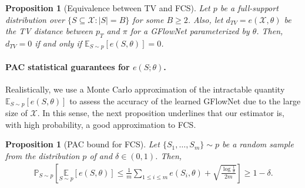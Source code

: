 \documentclass{article}
\theoremstyle{plain}
\newtheorem{proposition}[theorem]{Proposition}
\theoremstyle{definition}
\theoremstyle{remark}
\theoremstyle{remark}
\begin{document}
\begin{proposition}[Equivalence between TV and FCS] \label{prop:tv_fsc}  
    Let $p$ be a full-support distribution over $\{S \subseteq \mathcal{X} \colon |S| = B\}$ for some $B \ge 2$. Also, let $d_{TV} = e(\mathcal{X}, \theta)$ be the TV distance between $p_{T}$ and $\pi$ for a GFlowNet parameterized by $\theta$. Then, $d_{TV} = 0$ if and only if $\mathbb{E}_{S \sim p}[e(S, \theta)] = 0$.   
\end{proposition}





\paragraph{PAC statistical guarantees for $e(S ; \theta)$.} Realistically, we use a Monte Carlo approximation of the intractable quantity $\mathbb{E}_{S \sim p}[e(S, \theta)]$ to assess the accuracy of the learned GFlowNet due to the large size of $\mathcal{X}$. In this sense, the next proposition underlines that our estimator is, with high probability, a good approximation to FCS. %

\begin{proposition}[PAC bound for FCS] \label{prop:pac} 
    Let $\{S_{1}, \dots, S_{m}\} \sim p$ be a random sample from the distribution $p$ of  and $\delta \in (0, 1)$. Then, 
    \begin{equation*}
        \begin{aligned} 
            \mathbb{P}_{S \sim p}\left[ 
                \underset{S \sim p}{\mathbb{E}} \left[ e(S, \theta) \right] 
                \le \frac{1}{m} \sum_{1 \le i \le m} e(S_{i}, \theta) + \sqrt{\frac{\log \frac{1}{\delta}}{2m}}    
            \right] \ge 1 - \delta.
        \end{aligned} 
    \end{equation*} 
\end{proposition}
\end{document}
